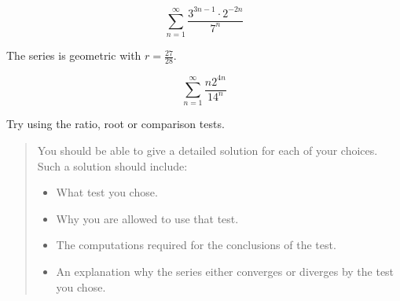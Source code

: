 \documentclass{ximera}
\begin{document}
\begin{exercise}

\begin{exercise}

\[
\sum^{\infty}_{n=1} \frac{3^{3n-1} \cdot 2^{-2n}}{7^n}
\]


\begin{multipleChoice}
\end{multipleChoice}

\begin{feedback}[correct]
The series is geometric with $r=\frac{27}{28}$. 
\end{feedback}
\end{exercise}


\begin{exercise}

\[
\sum^{\infty}_{n=1} \frac{n2^{4n}}{14^n}
\]


\begin{multipleChoice}
\end{multipleChoice}

\begin{feedback}[correct]
Try using the ratio, root or comparison tests.
\end{feedback}
\end{exercise}


\begin{quote}
You should be able to give a detailed solution for each of your choices.  Such a solution should include:

\begin{itemize}
\item What test you chose.
\item Why you are allowed to use that test.
\item The computations required for the conclusions of the test.
\item An explanation why the series either converges or diverges by the test you chose.
\end{itemize}

\end{quote}
\end{exercise}
\end{document}
